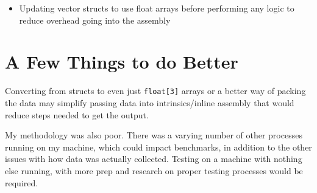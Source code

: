 \documentclass{article}
\newcommand{\code}[1]{\colorbox{light-gray}{\texttt{#1}}}
\begin{document}
\begin{itemize}
\item Updating vector structs to use float arrays before performing any logic to reduce overhead going into the assembly
\end{itemize}

\section{A Few Things to do Better}

Converting from structs to even just \code{float[3]} arrays or a better way of packing the data may simplify passing data into intrinsics/inline assembly that would reduce steps needed to get the output. 

\vspace{3mm}

My methodology was also poor. There was a varying number of other processes running on my machine, which could impact benchmarks, in addition to the other issues with how data was actually collected. Testing on a machine with nothing else running, with more prep and research on proper testing processes would be required.
\end{document}
